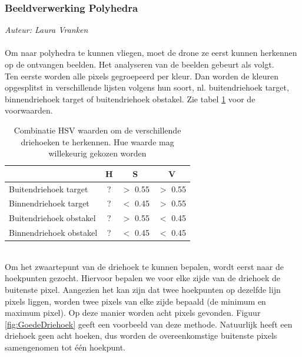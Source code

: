 \subsubsection{Beeldverwerking Polyhedra}
{\em Auteur: Laura Vranken}
\\
\\
\noindent
Om naar polyhedra te kunnen vliegen, moet de drone ze eerst kunnen herkennen op de ontvangen beelden. Het analyseren van de beelden gebeurt als volgt. 
\\
Ten eerste worden alle pixels gegroepeerd per kleur. Dan worden de kleuren opgesplitst in verschillende lijsten volgens hun soort, nl. buitendriehoek target, binnendriehoek target of buitendriehoek obstakel. Zie tabel \ref{table: HSVwaarden} voor de voorwaarden.
\begin{table}[h]
	\centering
\begin{tabular}{ l | c | c | c }
	 & H & S & V\\\hline
	Buitendriehoek target & ? & \(>\) 0.55 & \(>\) 0.55 \\
	Binnendriehoek target & ? & \(<\) 0.45 & \(>\) 0.55 \\
	Buitendriehoek obstakel & ? & \(>\) 0.55 & \(<\) 0.45 \\
	Binnendriehoek obstakel & ? & \(<\) 0.45 & \(<\) 0.45\\
\end{tabular}
\caption{\label{table: HSVwaarden}Combinatie HSV waarden om de verschillende driehoeken te herkennen. Hue waarde mag willekeurig gekozen worden}
\end{table}
\\
Om het zwaartepunt van de driehoek te kunnen bepalen, wordt eerst naar de hoekpunten gezocht. Hiervoor bepalen we voor elke zijde van de driehoek de buitenste pixel. Aangezien het kan zijn dat twee hoekpunten op dezelfde lijn pixels liggen, worden twee pixels van elke zijde bepaald (de minimum en maximum pixel). Op deze manier worden acht pixels gevonden. Figuur \ref{fig:GoedeDriehoek} geeft een voorbeeld van deze methode. Natuurlijk heeft een driehoek geen acht hoeken, dus worden de overeenkomstige buitenste pixels samengenomen tot één hoekpunt. 
